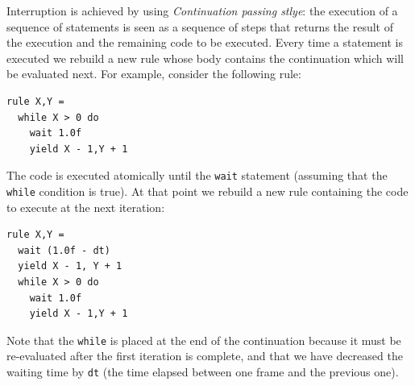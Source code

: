 Interruption is achieved by using \textit{Continuation passing stlye}: the execution of a sequence of statements is seen as a sequence of steps that returns the result of the execution and the remaining code to be executed. Every time a statement is executed we rebuild a new rule whose body contains the continuation which will be evaluated next. For example, consider the following rule:

\begin{lstlisting}
rule X,Y =
  while X > 0 do
    wait 1.0f
    yield X - 1,Y + 1
\end{lstlisting}

The code is executed atomically until the \texttt{wait} statement (assuming that the \texttt{while} condition is true). At that point we rebuild a new rule containing the code to execute at the next iteration:

\begin{lstlisting}
rule X,Y =
  wait (1.0f - dt)
  yield X - 1, Y + 1
  while X > 0 do
    wait 1.0f
    yield X - 1,Y + 1
\end{lstlisting}
Note that the \texttt{while} is placed at the end of the continuation because it must be re-evaluated after the first iteration is complete, and that we have decreased the waiting time by \texttt{dt} (the time elapsed between one frame and the previous one). 


